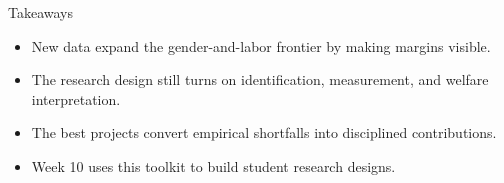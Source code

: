 \documentclass[aspectratio=169,11pt]{beamer}
\begin{document}
\begin{frame}{Takeaways}
\begin{itemize}
    \item New data expand the gender-and-labor frontier by making margins visible.
    \item The research design still turns on identification, measurement, and welfare interpretation.
    \item The best projects convert empirical shortfalls into disciplined contributions.
    \item Week 10 uses this toolkit to build student research designs.
\end{itemize}
\end{frame}
\end{document}
